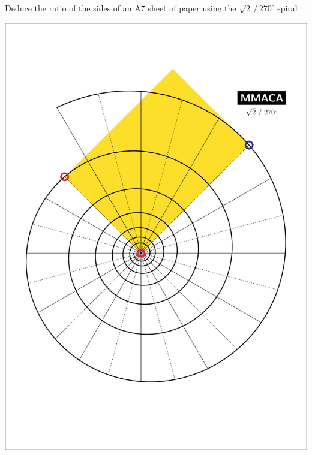 \documentclass[a4paper,12pt]{article}
\begin{document}
    \begin{center}
    
        \large

        Deduce the ratio of the sides of an A7 sheet of paper using the $\sqrt{2} \, / \, 270^{\circ}$ spiral

        \bigskip \bigskip \bigskip \bigskip
    
        \includegraphics[scale=0.7071]{./pictures/Example_01}

    \end{center}

    \newpage

\end{document}
